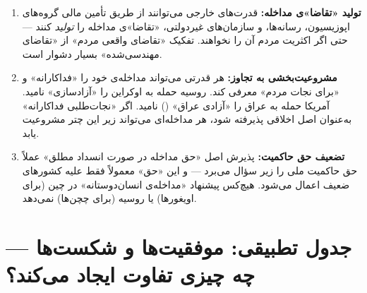 \begin{tcolorbox}[enemybox, title={چگونه قدرت‌ها از «نجات‌طلبی فداکارانه» سوءاستفاده می‌کنند}]
\begin{enumerate}
\item \textbf{تولید «تقاضا»ی مداخله:} قدرت‌های خارجی می‌توانند از طریق تأمین مالی گروه‌های اپوزیسیون، رسانه‌ها، و سازمان‌های غیردولتی، «تقاضا»ی مداخله را \textit{تولید} کنند — حتی اگر اکثریت مردم آن را نخواهند. تفکیک «تقاضای واقعی مردم» از «تقاضای مهندسی‌شده» بسیار دشوار است.

\item \textbf{مشروعیت‌بخشی به تجاوز:} هر قدرتی می‌تواند مداخله‌ی خود را «فداکارانه» و «برای نجات مردم» معرفی کند. روسیه حمله به اوکراین را «آزادسازی» نامید. آمریکا حمله به عراق را «آزادی عراق» () نامید. اگر «نجات‌طلبی فداکارانه» به‌عنوان اصل اخلاقی پذیرفته شود، هر مداخله‌ای می‌تواند زیر این چتر مشروعیت یابد.

\item \textbf{تضعیف حق حاکمیت:} پذیرش اصل «حق مداخله در صورت انسداد مطلق» عملاً حق حاکمیت ملی را زیر سؤال می‌برد — و این «حق» معمولاً فقط علیه کشورهای ضعیف اعمال می‌شود. هیچ‌کس پیشنهاد «مداخله‌ی انسان‌دوستانه» در چین (برای اویغورها) یا روسیه (برای چچن‌ها) نمی‌دهد.
\end{enumerate}
\end{tcolorbox}


\section{جدول تطبیقی: موفقیت‌ها و شکست‌ها — چه چیزی تفاوت ایجاد می‌کند؟}
\label{sec:ch15-comparison-table}


